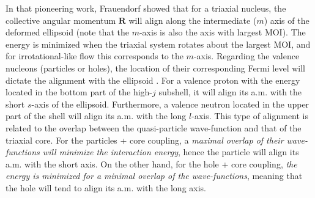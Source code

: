 In that pioneering work, Frauendorf showed that for a triaxial nucleus, the collective angular momentum $\mathbf{R}$ will align along the intermediate ($m$) axis of the deformed ellipsoid (note that the $m$-axis is also the axis with largest MOI). The energy is minimized when the triaxial system rotates about the largest MOI, and for irrotational-like flow this corresponds to the $m$-axis. Regarding the valence nucleons (particles or holes), the location of their corresponding Fermi level will dictate the alignment with the ellipsoid \cite{frauendorf1997tilted,starosta2001chiral}. For a valence proton with the energy located in the bottom part of the high-$j$ subshell, it will align its a.m. with the short $s$-axis of the ellipsoid. Furthermore, a valence neutron located in the upper part of the shell will align its a.m. with the long $l$-axis. This type of alignment is related to the overlap between the quasi-particle wave-function and that of the triaxial core. For the particles + core coupling, a \emph{maximal overlap of their wave-functions will minimize the interaction energy}, hence the particle will align its a.m. with the short axis. On the other hand, for the hole + core coupling, \emph{the energy is minimized for a minimal overlap of the wave-functions}, meaning that the hole will tend to align its a.m. with the long axis.

